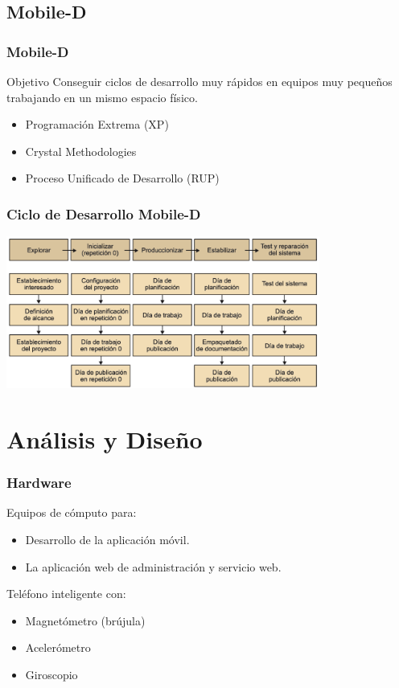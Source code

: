 \documentclass[12pt]{beamer}
\begin{document}
\subsection{Mobile-D}

\begin{frame}
	\frametitle{Mobile-D}
	\begin{block}{Objetivo}
		Conseguir ciclos de desarrollo muy rápidos en equipos muy pequeños trabajando en un mismo espacio físico.\cite{MobileD}
	\end{block}
	\begin{block} \small 
		\begin{itemize}
			\item 	Programación Extrema (XP)
			\item Crystal Methodologies
			\item Proceso Unificado de Desarrollo (RUP)
		\end{itemize} 
	\end{block}
\end{frame}

\begin{frame}
	\frametitle{Ciclo de Desarrollo Mobile-D}
	\begin{center}

	\includegraphics[height=5cm]{imagenes/mobiled.png}
		\end{center}
\end{frame}

\section{Análisis y Diseño}

\begin{frame}
	\frametitle{Hardware}
	\begin{block}{	Equipos de cómputo para:}
	\begin{itemize}
		\item Desarrollo de la aplicación móvil.
		\item La aplicación web de administración y servicio web.
	\end{itemize}
	\end{block}
	
	\begin{block}{	Teléfono inteligente con:}
	\begin{itemize}
		\item Magnetómetro (brújula)
		\item Acelerómetro
		\item Giroscopio
	\end{itemize}
	\end{block}
\end{frame}
\end{document}
